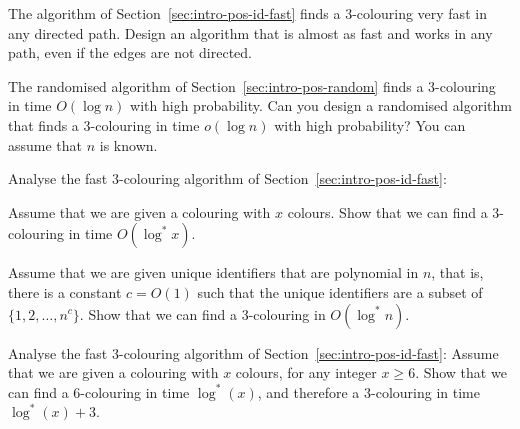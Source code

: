 \begin{ex}\label{ex:intro-undir-path}
    The algorithm of Section~\ref{sec:intro-pos-id-fast} finds a $3$-colouring very fast in any directed path. Design an algorithm that is almost as fast and works in any path, even if the edges are not directed.

\end{ex}

\begin{ex}
    The randomised algorithm of Section~\ref{sec:intro-pos-random} finds a $3$-colouring in time $O(\log n)$ with high probability. Can you design a randomised algorithm that finds a $3$-colouring in time $o(\log n)$ with high probability? You can assume that $n$ is known.

\end{ex}

\begin{ex}\label{ex:logstar}
    Analyse the fast $3$-colouring algorithm of Section~\ref{sec:intro-pos-id-fast}:
    \begin{subex}
        \item Assume that we are given a colouring with $x$ colours. Show that we can find a $3$-colouring in time $O(\log^* x)$.
        \item Assume that we are given unique identifiers that are polynomial in $n$, that is, there is a constant $c = O(1)$ such that the unique identifiers are a subset of $\{1,2,\dotsc,n^c\}$. Show that we can find a $3$-colouring in $O(\log^* n)$.
    \end{subex}
\end{ex}

\begin{exs}\label{ex:logstar-tight}
    Analyse the fast $3$-colouring algorithm of Section~\ref{sec:intro-pos-id-fast}:
    Assume that we are given a colouring with $x$ colours, for any integer $x \ge 6$. Show that we can find a $6$-colouring in time $\log^*(x)$, and therefore a $3$-colouring in time $\log^*(x) + 3$.
\end{exs}

